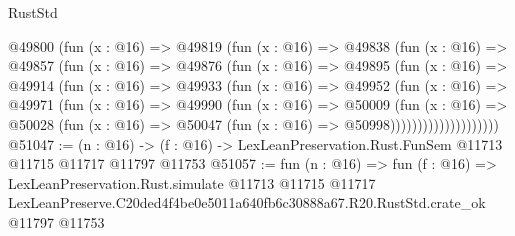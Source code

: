 \begin{lexlean}{RustStd}
\begin{coremodule}
              @49800
                (fun (x : @16) =>
                @49819
                  (fun (x : @16) =>
                  @49838
                    (fun (x : @16) =>
                    @49857
                      (fun (x : @16) =>
                      @49876
                        (fun (x : @16) =>
                        @49895
                          (fun (x : @16) =>
                          @49914
                            (fun (x : @16) =>
                            @49933
                              (fun (x : @16) =>
                              @49952
                                (fun (x : @16) =>
                                @49971
                                  (fun (x : @16) =>
                                  @49990
                                    (fun (x : @16) =>
                                    @50009
                                      (fun (x : @16) =>
                                      @50028
                                        (fun (x : @16) =>
                                        @50047 (fun (x : @16) => @50998))))))))))))))))))))
@51047 := (n : @16) ->
  (f : @16) -> LexLeanPreservation.Rust.FunSem @11713 @11715 @11717 @11797 @11753
@51057 := fun (n : @16) =>
  fun (f : @16) =>
  LexLeanPreservation.Rust.simulate
    @11713
    @11715
    @11717
    LexLeanPreserve.C20ded4f4be0e5011a640fb6c30888a67.R20.RustStd.crate_ok
    @11797
    @11753
\end{coremodule}
\end{lexlean}
